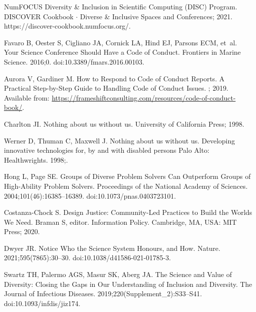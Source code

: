 \documentclass[10pt,letterpaper]{article}
\begin{document}
\begin{thebibliography}{10}
{NumFOCUS Diversity \& Inclusion in Scientific Computing (DISC) Program}.
  {{DISCOVER Cookbook}} {$\cdot$} {{Diverse}} \& {{Inclusive Spaces}} and
  {{Conferences}}; 2021.
\newblock https://discover-cookbook.numfocus.org/.

Favaro B, Oester S, Cigliano JA, Cornick LA, Hind EJ, Parsons ECM, et~al.
\newblock Your {{Science Conference Should Have}} a {{Code}} of {{Conduct}}.
\newblock Frontiers in Marine Science. 2016;0.
\newblock doi:{10.3389/fmars.2016.00103}.

Aurora V, Gardiner M.
\newblock How to {{Respond}} to {{Code}} of {{Conduct Reports}}. {{A}}
  Practical Step-by-Step Guide to Handling Code of Conduct Issues.
; 2019.
\newblock Available from:
  \url{https://frameshiftconsulting.com/resources/code-of-conduct-book/}.

Charlton JI.
\newblock Nothing about us without us.
\newblock University of California Press; 1998.

Werner D, Thuman C, Maxwell J.
\newblock Nothing about us without us.
\newblock Developing innovative technologies for, by and with disabled persons
  Palo Alto: Healthwrights. 1998;.

Hong L, Page SE.
\newblock Groups of Diverse Problem Solvers Can Outperform Groups of
  High-Ability Problem Solvers.
\newblock Proceedings of the National Academy of Sciences.
  2004;101(46):16385--16389.
\newblock doi:{10.1073/pnas.0403723101}.

{Costanza-Chock} S.
\newblock Design Justice: Community-Led Practices to Build the Worlds We Need.
\newblock Braman S, editor. Information {{Policy}}. {Cambridge, MA, USA}: {MIT
  Press}; 2020.

Dwyer JR.
\newblock Notice Who the Science System Honours, and How.
\newblock Nature. 2021;595(7865):30--30.
\newblock doi:{10.1038/d41586-021-01785-3}.

Swartz TH, Palermo AGS, Masur SK, Aberg JA.
\newblock The {{Science}} and {{Value}} of {{Diversity}}: Closing the {{Gaps}}
  in {{Our Understanding}} of {{Inclusion}} and {{Diversity}}.
\newblock The Journal of Infectious Diseases. 2019;220(Supplement\_2):S33--S41.
\newblock doi:{10.1093/infdis/jiz174}.


\end{thebibliography}
\end{document}
